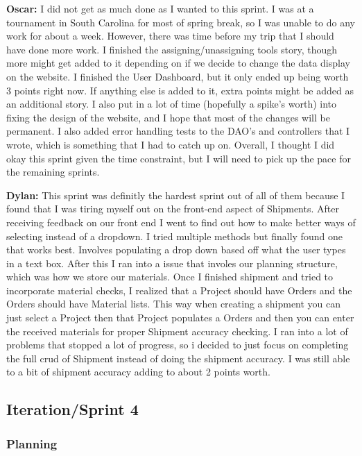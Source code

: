 \documentclass{article}
\begin{document}
\textbf{Oscar:} I did not get as much done as I wanted to this sprint. I was at a tournament in South Carolina for most of spring break, so I was unable to do any work for about a week. However, there was time before my trip that I should have done more work. I finished the assigning/unassigning tools story, though more might get added to it depending on if we decide to change the data display on the website. I finished the User Dashboard, but it only ended up being worth 3 points right now. If anything else is added to it, extra points might be added as an additional story. I also put in a lot of time (hopefully a spike's worth) into fixing the design of the website, and I hope that most of the changes will be permanent. I also added error handling tests to the DAO's and controllers that I wrote, which is something that I had to catch up on. Overall, I thought I did okay this sprint given the time constraint, but I will need to pick up the pace for the remaining sprints. 

\textbf{Dylan:} This sprint was definitly the hardest sprint out of all of them because I found that I was tiring myself out on the front-end aspect of Shipments. After receiving feedback on our front end I went to find out how to make better ways of selecting instead of a dropdown. I tried multiple methods but finally found one that works best. Involves populating a drop down based off what the user types in a text box. After this I ran into a issue that involes our planning structure, which was how we store our materials. Once I finished shipment and tried to incorporate material checks, I realized that a Project should have Orders and the Orders should have Material lists. This way when creating a shipment you can just select a Project then that Project populates a Orders and then you can enter the received materials for proper Shipment accuracy checking. I ran into a lot of problems that stopped a lot of progress, so i decided to just focus on completing the full crud of Shipment instead of doing the shipment accuracy. I was still able to a bit of shipment accuracy adding to about 2 points worth. 

\subsection{Iteration/Sprint 4}

\subsubsection{Planning}
\end{document}

